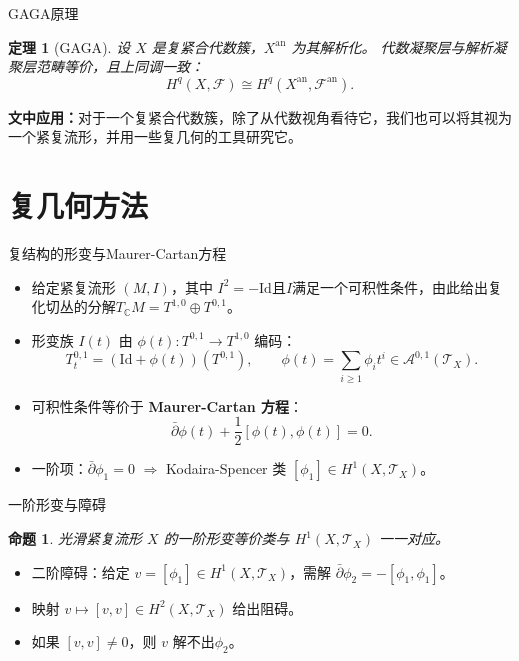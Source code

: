 \documentclass{beamer}
\theoremstyle{definition}
\theoremstyle{plain}
\newtheorem{thm}[defn]{定理}
\newtheorem{prop}[defn]{命题}
\begin{document}
\begin{frame}{GAGA原理}
\begin{thm}[GAGA\cite{SerreGAGA}]
设 $X$ 是复紧合代数簇，$X^{\mathrm{an}}$ 为其解析化。
代数凝聚层与解析凝聚层范畴等价，且上同调一致：
\[
H^q(X,\mathscr{F})\cong H^q(X^{\mathrm{an}},\mathscr{F}^{\mathrm{an}}).
\]
\end{thm}
\vspace{-5pt}
\textbf{文中应用：}对于一个复紧合代数簇，除了从代数视角看待它，我们也可以将其视为一个紧复流形，并用一些复几何的工具研究它。
\end{frame}

\section{复几何方法}
\begin{frame}{复结构的形变与Maurer-Cartan方程}
\begin{itemize}
    \item 给定紧复流形 $(M,I)$，其中 $I^2=-\mathrm{Id}$且$ I $满足一个可积性条件，由此给出复化切丛的分解$T_{\mathbb{C}}M=T^{1,0}\oplus T^{0,1}$。
    \item 形变族 $I(t)$ 由 $\phi(t):T^{0,1}\to T^{1,0}$ 编码：
    \[
    T^{0,1}_t=(\mathrm{Id}+\phi(t))(T^{0,1}),\qquad \phi(t)=\sum_{i\ge1}\phi_i t^i\in\mathcal{A}^{0,1}(\mathcal{T}_X).
    \]
    \item 可积性条件等价于 \textbf{Maurer-Cartan 方程}：
    \[
    \bar\partial\phi(t)+\frac12[\phi(t),\phi(t)]=0.
    \]
    \item 一阶项：$\bar\partial\phi_1=0$ $\Rightarrow$ Kodaira-Spencer 类 $[\phi_1]\in H^1(X,\mathcal{T}_X)$。
\end{itemize}
\end{frame}

\begin{frame}{一阶形变与障碍}
\begin{prop}
光滑紧复流形 $X$ 的一阶形变等价类与 $H^1(X,\mathcal{T}_X)$ 一一对应。
\end{prop}
\vspace{-5pt}
\begin{itemize}
    \item 二阶障碍：给定 $v=[\phi_1]\in H^1(X,\mathcal{T}_X)$，需解 $\bar\partial\phi_2=-[\phi_1,\phi_1]$。
    \item 映射 $v\mapsto [v,v]\in H^2(X,\mathcal{T}_X)$ 给出阻碍。
    \item 如果 $[v,v]\neq 0$，则 $v$ 解不出$ \phi_2 $。
\end{itemize}
\end{frame}
\end{document}
